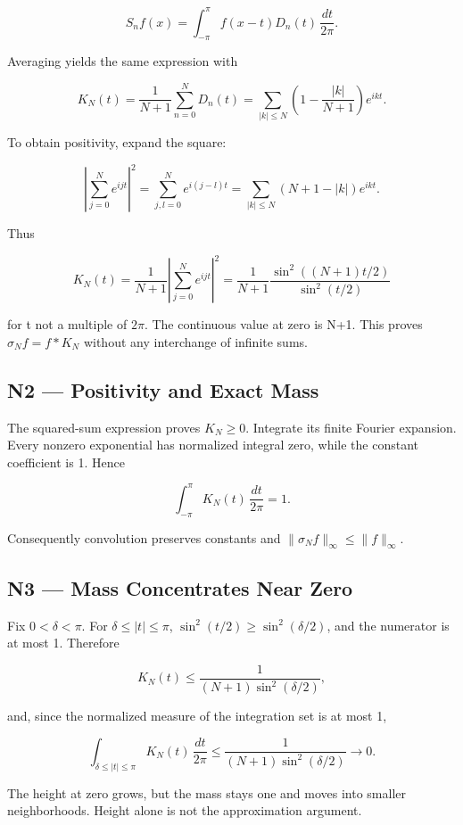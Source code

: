\documentclass[preprint,12pt,aps,pra,showkeys,amsmath,amssymb,superscriptaddress,floatfix]{revtex4-2}
\theoremstyle{definition}
\theoremstyle{remark}
\begin{document}
\[S_nf(x)=\int_{-\pi}^{\pi}f(x-t)D_n(t)\,\frac{dt}{2\pi}.\]

Averaging yields the same expression with

\[K_N(t)=\frac1{N+1}\sum_{n=0}^ND_n(t)=\sum_{|k|\le N}\left(1-\frac{|k|}{N+1}\right)e^{ikt}.\]

To obtain positivity, expand the square:

\[\left|\sum_{j=0}^Ne^{ijt}\right|^2=\sum_{j,l=0}^Ne^{i(j-l)t}=\sum_{|k|\le N}(N+1-|k|)e^{ikt}.\]

Thus

\[K_N(t)=\frac1{N+1}\left|\sum_{j=0}^Ne^{ijt}\right|^2=\frac1{N+1}\frac{\sin^2((N+1)t/2)}{\sin^2(t/2)}\]

for t not a multiple of \(2\pi\). The continuous value at zero is N+1.
This proves \(\sigma_Nf=f*K_N\) without any interchange of infinite
sums.

\subsection{N2 --- Positivity and Exact
Mass}\label{n2-positivity-and-exact-mass}

The squared-sum expression proves \(K_N\ge0\). Integrate its finite
Fourier expansion. Every nonzero exponential has normalized integral
zero, while the constant coefficient is 1. Hence

\[\int_{-\pi}^{\pi}K_N(t)\,\frac{dt}{2\pi}=1.\]

Consequently convolution preserves constants and
\(\|\sigma_N f\|_\infty\le\|f\|_\infty\).

\subsection{N3 --- Mass Concentrates Near
Zero}\label{n3-mass-concentrates-near-zero}

Fix \(0<\delta<\pi\). For \(\delta\le|t|\le\pi\),
\(\sin^2(t/2)\ge\sin^2(\delta/2)\), and the numerator is at most 1.
Therefore

\[K_N(t)\le\frac1{(N+1)\sin^2(\delta/2)},\]

and, since the normalized measure of the integration set is at most 1,

\[\int_{\delta\le|t|\le\pi}K_N(t)\,\frac{dt}{2\pi}\le\frac1{(N+1)\sin^2(\delta/2)}\to0.\]

The height at zero grows, but the mass stays one and moves into smaller
neighborhoods. Height alone is not the approximation argument.
\end{document}
